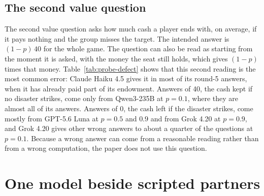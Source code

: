 \documentclass[10pt]{article}
\let\plainsubsection\subsection
\renewcommand{\subsection}{\FloatBarrier\needspace{8\baselineskip}\plainsubsection}
\let\plainsection\section
\renewcommand{\section}{\FloatBarrier\needspace{12\baselineskip}\plainsection}  %
\begin{document}
\begin{table}[h]
\caption{Answers and play of the questioned seat (ten games per risk level). \emph{Shift}: drop in the share saying B from $p=0.1$ to $p=0.9$, and change in the units paid, with intervals that resample the games at the two risk levels independently.}
\label{tab:knowdo}
\centering\small

\end{table}

\subsection{The second value question}
\label{sec:second-value}

The second value question asks how much cash a player ends with, on average, if it pays nothing and the group misses the target. The intended answer is $(1-p)\,40$ for the whole game. The question can also be read as starting from the moment it is asked, with the money the seat still holds, which gives $(1-p)$ times that money. Table~\ref{tab:probe-defect} shows that this second reading is the most common error: Claude Haiku 4.5 gives it in most of its round-5 answers, when it has already paid part of its endowment. Answers of 40, the cash kept if no disaster strikes, come only from Qwen3-235B at $p=0.1$, where they are almost all of its answers. Answers of 0, the cash left if the disaster strikes, come mostly from GPT-5.6 Luna at $p=0.5$ and $0.9$ and from Grok 4.20 at $p=0.9$, and Grok 4.20 gives other wrong answers to about a quarter of the questions at $p=0.1$. Because a wrong answer can come from a reasonable reading rather than from a wrong computation, the paper does not use this question.

\begin{table}[h]
\caption{The second value question, by model and risk level (30 answers per entry). \emph{Correct (\%)}: overall and in rounds 1, 5 and 10. \emph{Wrong answers}, as shares of all answers: 40; 0; \emph{Cash left}, which is $(1-p)$ times the seat's money at the time of asking, rounded; and any other number.}
\label{tab:probe-defect}
\centering\small

\end{table}

\section{One model beside scripted partners}
\label{sec:scripted}
\end{document}
